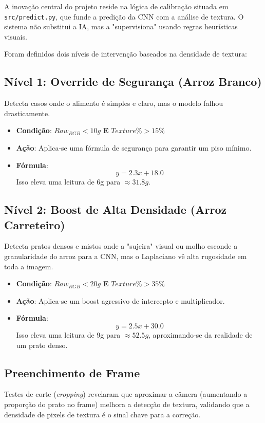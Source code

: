 \documentclass[a4paper,12pt]{article}
\begin{document}
A inovação central do projeto reside na lógica de calibração situada em \texttt{src/predict.py}, que funde a predição da CNN com a análise de textura. O sistema não substitui a IA, mas a "supervisiona" usando regras heurísticas visuais.

Foram definidos dois níveis de intervenção baseados na densidade de textura:

\subsection{Nível 1: Override de Segurança (Arroz Branco)}
Detecta casos onde o alimento é simples e claro, mas o modelo falhou drasticamente.
\begin{itemize}
    \item \textbf{Condição}: $Raw_{RGB} < 10g$ \textbf{E} $Texture\% > 15\%$
    \item \textbf{Ação}: Aplica-se uma fórmula de segurança para garantir um piso mínimo.
    \item \textbf{Fórmula}:
    \begin{equation}
    y = 2.3x + 18.0
    \end{equation}
    Isso eleva uma leitura de 6g para $\approx 31.8g$.
\end{itemize}

\subsection{Nível 2: Boost de Alta Densidade (Arroz Carreteiro)}
Detecta pratos densos e mistos onde a "sujeira" visual ou molho esconde a granularidade do arroz para a CNN, mas o Laplaciano vê alta rugosidade em toda a imagem.
\begin{itemize}
    \item \textbf{Condição}: $Raw_{RGB} < 20g$ \textbf{E} $Texture\% > 35\%$
    \item \textbf{Ação}: Aplica-se um boost agressivo de intercepto e multiplicador.
    \item \textbf{Fórmula}:
    \begin{equation}
    y = 2.5x + 30.0
    \end{equation}
    Isso eleva uma leitura de 9g para $\approx 52.5g$, aproximando-se da realidade de um prato denso.
\end{itemize}

\subsection{Preenchimento de Frame}
Testes de corte (\textit{cropping}) revelaram que aproximar a câmera (aumentando a proporção do prato no frame) melhora a detecção de textura, validando que a densidade de pixels de textura é o sinal chave para a correção.
\end{document}
